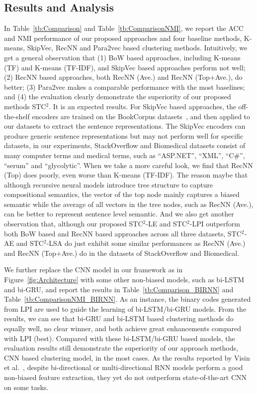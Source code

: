 \documentclass[review]{elsarticle}
\begin{document}
\subsection{Results and Analysis}
In Table~\ref{tb:Comparison} and Table~\ref{tb:ComparisonNMI}, we report the ACC and NMI performance of our proposed approaches and four baseline methods, K-means, SkipVec, RecNN and Para2vec based clustering methods. Intuitively, we get a general observation that (1) BoW based approaches, including K-means (TF) and K-means (TF-IDF), and SkipVec based approaches perform not well; (2) RecNN based approaches, both RecNN (Ave.) and RecNN (Top+Ave.), do better; (3) Para2vec makes a comparable performance with the most baselines; and (4) the evaluation clearly demonstrate the superiority of our proposed methods STC$^2$. It is an expected results.
For SkipVec based approaches, the off-the-shelf encoders are trained on the BookCorpus datasets~\cite{zhu2015aligning}, and then applied to our datasets to extract the sentence representations. The SkipVec encoders can produce generic sentence representations but may not perform well for specific datasets, in our experiments, StackOverflow and Biomedical datasets consist of many computer terms and medical terms, such as ``ASP.NET'', ``XML'', ``C\#'', ``serum'' and ``glycolytic''.
When we take a more careful look, we find that RecNN (Top) does poorly, even worse than K-means (TF-IDF). The reason maybe that although recursive neural models introduce tree structure to capture compositional semantics, the vector of the top node mainly captures a biased semantic while the average of all vectors in the tree nodes, such as RecNN (Ave.), can be better to represent sentence level semantic. And we also get another observation that, although our proposed STC$^2$-LE and STC$^2$-LPI outperform both BoW based and RecNN based approaches across all three datasets, STC$^2$-AE and STC$^2$-LSA do just exhibit some similar performances as RecNN (Ave.) and RecNN (Top+Ave.) do in the datasets of StackOverflow and Biomedical.

We further replace the CNN model in our framework as in Figure~\ref{fig:Architecture} with some other non-biased models, such as bi-LSTM and bi-GRU, and report the results in Table~\ref{tb:Comparison_BIRNN} and Table~\ref{tb:ComparisonNMI_BIRNN}. As an instance, the binary codes generated from LPI are used to guide the learning of bi-LSTM/bi-GRU models. From the results, we can see that bi-GRU and bi-LSTM based clustering methods do equally well, no clear winner, and both achieve great enhancements compared with LPI (best). Compared with these bi-LSTM/bi-GRU based models, the evaluation results still demonstrate the superiority of our approach methods, CNN based clustering model, in the most cases. As the results reported by Visin et al.~\cite{visin2015renet}, despite bi-directional or multi-directional RNN models perform a good non-biased feature extraction, they yet do not outperform state-of-the-art CNN on some tasks.
\end{document}
